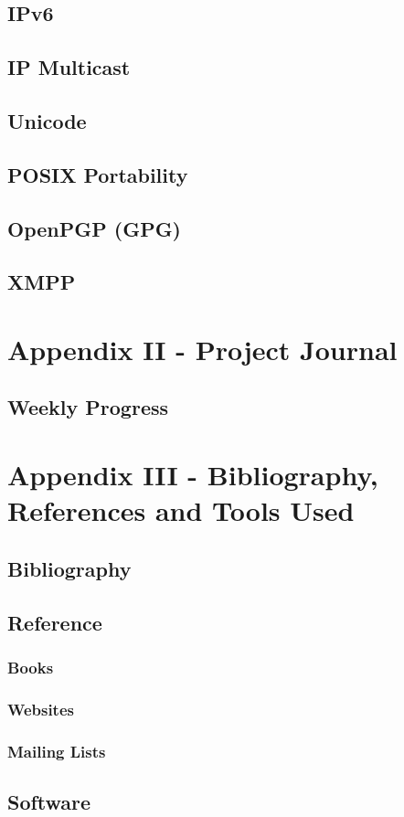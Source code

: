 \documentclass[a4paper,12pt]{article}
\begin{document}
\section{IPv6}

\section{IP Multicast}

\section{Unicode}

\section{POSIX Portability}

\section{OpenPGP (GPG)}

\section{XMPP}

\pagebreak


\chapter{Appendix II - Project Journal}

\section{Weekly Progress}

\pagebreak


\chapter{Appendix III - Bibliography, References and Tools Used}

\section{Bibliography}

\section{Reference}

\subsection{Books}

\subsection{Websites}

\subsection{Mailing Lists}

\section{Software}
\end{document}
